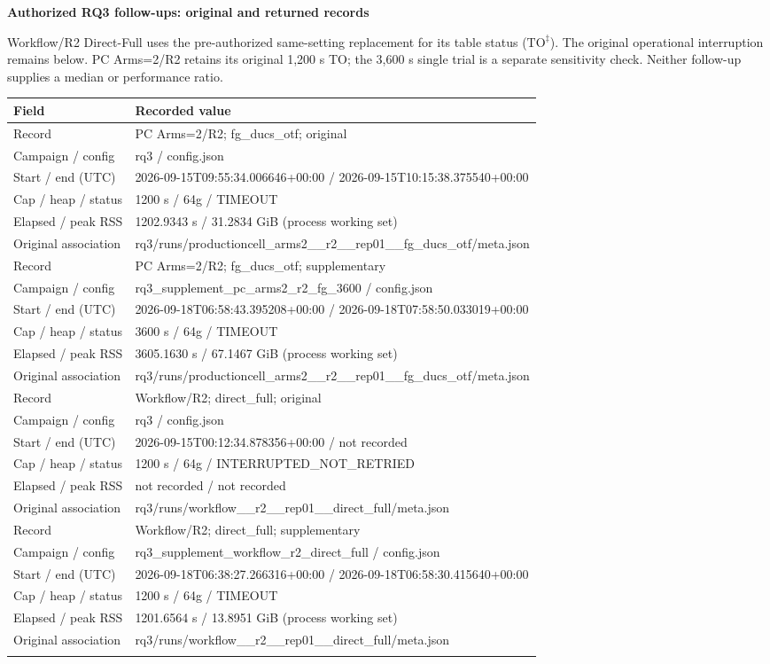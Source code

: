 \noindent\textbf{Authorized RQ3 follow-ups: original and returned records}\par
Workflow/R2 Direct-Full uses the pre-authorized same-setting replacement for its table status ($\mathrm{TO}^{\ddagger}$). The original operational interruption remains below. PC Arms=2/R2 retains its original 1,200 s TO; the 3,600 s single trial is a separate sensitivity check. Neither follow-up supplies a median or performance ratio.
\begingroup\scriptsize\begin{longtable}{@{}p{.21\linewidth}p{.73\linewidth}@{}}\toprule Field & Recorded value\\\midrule\endhead
Record & PC Arms=2/R2; fg\_ducs\_otf; original\\
Campaign / config & rq3 / config.json\\
Start / end (UTC) & 2026-09-15T09:55:34.006646+00:00 / 2026-09-15T10:15:38.375540+00:00\\
Cap / heap / status & 1200 s / 64g / TIMEOUT\\
Elapsed / peak RSS & 1202.9343 s / 31.2834 GiB (process working set)\\
Original association & rq3/runs/productioncell\_arms2\_\_r2\_\_rep01\_\_fg\_ducs\_otf/meta.json\\
\addlinespace[4pt]
Record & PC Arms=2/R2; fg\_ducs\_otf; supplementary\\
Campaign / config & rq3\_supplement\_pc\_arms2\_r2\_fg\_3600 / config.json\\
Start / end (UTC) & 2026-09-18T06:58:43.395208+00:00 / 2026-09-18T07:58:50.033019+00:00\\
Cap / heap / status & 3600 s / 64g / TIMEOUT\\
Elapsed / peak RSS & 3605.1630 s / 67.1467 GiB (process working set)\\
Original association & rq3/runs/productioncell\_arms2\_\_r2\_\_rep01\_\_fg\_ducs\_otf/meta.json\\
\addlinespace[4pt]
Record & Workflow/R2; direct\_full; original\\
Campaign / config & rq3 / config.json\\
Start / end (UTC) & 2026-09-15T00:12:34.878356+00:00 / not recorded\\
Cap / heap / status & 1200 s / 64g / INTERRUPTED\_NOT\_RETRIED\\
Elapsed / peak RSS & not recorded / not recorded\\
Original association & rq3/runs/workflow\_\_r2\_\_rep01\_\_direct\_full/meta.json\\
\addlinespace[4pt]
Record & Workflow/R2; direct\_full; supplementary\\
Campaign / config & rq3\_supplement\_workflow\_r2\_direct\_full / config.json\\
Start / end (UTC) & 2026-09-18T06:38:27.266316+00:00 / 2026-09-18T06:58:30.415640+00:00\\
Cap / heap / status & 1200 s / 64g / TIMEOUT\\
Elapsed / peak RSS & 1201.6564 s / 13.8951 GiB (process working set)\\
Original association & rq3/runs/workflow\_\_r2\_\_rep01\_\_direct\_full/meta.json\\
\addlinespace[4pt]
\bottomrule\end{longtable}\endgroup
